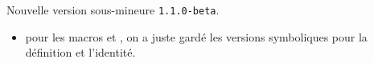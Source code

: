 Nouvelle version sous-mineure \verb+1.1.0-beta+.

\begin{itemize}[itemsep=.5em]
    \item {}
          pour les macros  et , on a juste gardé les versions symboliques pour la définition et l'identité.
\end{itemize}


\separation
